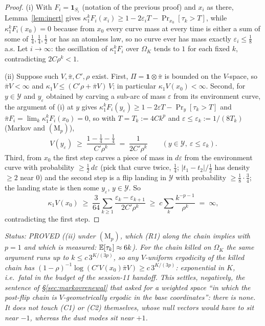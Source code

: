 \begin{proof}
(i) With $F_i=\mathbf 1_{S_i}$ (notation of the previous proof) and
$x_i$ as there, Lemma~\ref{lem:inert} gives
$\kappa_1^kF_i(x_i)\ge1-2\varepsilon_iT-\Pr_{x_0}[\tau_k>T]$, while
$\kappa_1^kF_i(x_0)=0$ because from $x_0$ every curve mass at every time
is either a sum of some of $\tfrac14,\tfrac14,\tfrac12$ or has an
atomless law, so no curve ever has mass exactly $\varepsilon_i\le\tfrac18$ a.s.  Let
$i\to\infty$: the oscillation of $\kappa_1^kF_i$ over $\Omega_K$ tends
to $1$ for each fixed $k$, contradicting $2C\rho^k<1$.

(ii) Suppose such $V,\bar\pi,C',\rho$ exist.  First, $\Pi=\mathbf 1\otimes\bar\pi$
is bounded on the $V$-space, so $\bar\pi V<\infty$ and
$\kappa_1V\le(C'\rho+\bar\pi V)\,V$; in particular $\kappa_1V(x_0)<\infty$.
Second, for $y\in\mathcal Y$ and $y_\varepsilon$ obtained by carving a
sub-arc of mass $\varepsilon$ from its environment curve, the argument
of (i) at $y$ gives $\kappa_1^kF_i(y_\varepsilon)\ge1-2\varepsilon T-\Pr_y[\tau_k>T]$
and $\bar\pi F_i=\lim_k\kappa_1^kF_i(x_0)=0$, so with $T=T_k:=4Ck^p$
and $\varepsilon\le\varepsilon_k:=1/(8T_k)$ (Markov and $(\mathrm M_p)$),
\[
V(y_\varepsilon)\;\ge\;\frac{1-\tfrac14-\tfrac14}{C'\rho^k}\;=\;\frac1{2C'\rho^k}
\qquad(y\in\mathcal Y,\ \varepsilon\le\varepsilon_k).
\]
Third, from $x_0$ the first step carves a piece of mass in
$d\varepsilon$ from the environment curve with probability
$\ge\tfrac12\,d\varepsilon$ (pick that curve twice, $\tfrac14$;
$|t_1-t_2|/\tfrac12$ has density $\ge2$ near $0$) and the second step
is a flip landing in $\mathcal Y$ with probability $\ge\tfrac18\cdot\tfrac34$;
the landing state is then some $y_\varepsilon$, $y\in\mathcal Y$.  So
\[
\kappa_1V(x_0)\;\ge\;\frac{3}{64}\sum_{k\ge1}\frac{\varepsilon_k-\varepsilon_{k+1}}{2C'\rho^k}
\;\ge\;c\sum_k\frac{k^{-p-1}}{\rho^{k}}\;=\;\infty ,
\]
contradicting the first step.
\end{proof}

\emph{Status: PROVED ((ii) under $(\mathrm M_p)$, which (R1) along the
chain implies with $p=1$ and which is measured: $\mathbb{E}[\tau_k]\approx6k$).
For the chain killed on $\Omega_K$ the same argument runs up to
$k\le c\,3^{K/(3p)}$, so any $V$-uniform ergodicity of the killed chain
has $(1-\rho)^{-1}\log(C'V(x_0)\bar\pi V)\ge c\,3^{K/(3p)}$: exponential
in $K$, i.e.\ fatal in the budget of the session-11 handoff.  This
settles, negatively, the sentence of \S\ref{sec:markovrenewal} that
asked for a weighted space ``in which the post-flip chain is
$V$-geometrically ergodic in the base coordinates'': there is none.
It does \emph{not} touch (C1) or (C2) themselves, whose null vectors
would have to sit near $-1$, whereas the dust modes sit near $+1$.}

